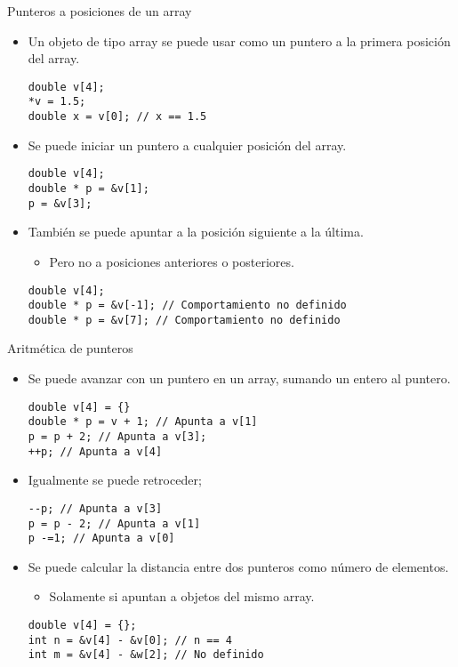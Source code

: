 \begin{frame}[fragile]{Punteros a posiciones de un array}
\begin{itemize}
  \item Un objeto de tipo array se puede usar como un puntero a la primera posición del array.
\begin{lstlisting}
double v[4];
*v = 1.5;
double x = v[0]; // x == 1.5
\end{lstlisting}
  \item Se puede iniciar un puntero a cualquier posición del array.
\begin{lstlisting}
double v[4];
double * p = &v[1];
p = &v[3];
\end{lstlisting}
  \item También se puede apuntar a la posición siguiente a la última.
    \begin{itemize}
      \item Pero no a posiciones anteriores o posteriores.
    \end{itemize}
\begin{lstlisting}
double v[4];
double * p = &v[-1]; // Comportamiento no definido
double * p = &v[7]; // Comportamiento no definido
\end{lstlisting}
\end{itemize}
\end{frame}

\begin{frame}[fragile]{Aritmética de punteros}
\begin{itemize}
  \item Se puede avanzar con un puntero en un array, sumando un entero al puntero.
\begin{lstlisting}
double v[4] = {}
double * p = v + 1; // Apunta a v[1]
p = p + 2; // Apunta a v[3];
++p; // Apunta a v[4]
\end{lstlisting}
  \item Igualmente se puede retroceder;
\begin{lstlisting}
--p; // Apunta a v[3]
p = p - 2; // Apunta a v[1]
p -=1; // Apunta a v[0]
\end{lstlisting}
  \item Se puede calcular la distancia entre dos punteros como número de elementos.
    \begin{itemize}
      \item Solamente si apuntan a objetos del mismo array.
    \end{itemize}
\begin{lstlisting}
double v[4] = {};
int n = &v[4] - &v[0]; // n == 4
int m = &v[4] - &w[2]; // No definido
\end{lstlisting}
\end{itemize}
\end{frame}

